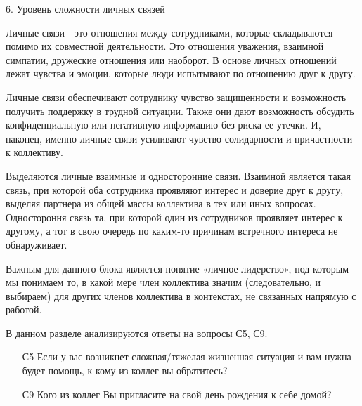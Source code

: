 \begin{frame}{6. Уровень сложности личных связей }

\tiny
Личные связи - это отношения между сотрудниками, которые складываются помимо их совместной деятельности. Это отношения уважения, взаимной симпатии, дружеские отношения или наоборот.  В основе личных отношений лежат чувства и эмоции, которые люди испытывают по отношению друг к другу.
\smallskip

Личные связи обеспечивают сотруднику чувство защищенности и возможность получить поддержку в трудной ситуации. Также они дают возможность обсудить конфиденциальную или негативную информацию без риска ее утечки. И, наконец, именно личные связи усиливают чувство солидарности и причастности к коллективу.
\smallskip

Выделяются личные взаимные и односторонние связи. Взаимной является такая связь, при  которой оба сотрудника проявляют интерес и доверие друг к другу, выделяя партнера из общей массы коллектива в тех или иных вопросах. Одностороння связь та, при  которой один из сотрудников проявляет интерес к другому, а тот в свою очередь по каким-то причинам встречного интереса не обнаруживает. 
\smallskip

Важным для данного блока является понятие «личное лидерство», под которым мы понимаем то, в какой мере член коллектива значим (следовательно, и выбираем) для других членов коллектива в контекстах, не связанных напрямую с работой.
\bigskip

В данном разделе анализируются ответы на вопросы С5, С9.
\smallskip

\begin{itemize}

\item [С5] Если у вас возникнет сложная/тяжелая жизненная ситуация и вам нужна будет помощь, к кому из коллег вы обратитесь?

\item [С9] Кого из коллег Вы пригласите на свой день рождения к себе домой?

\end{itemize}
\end{frame}


